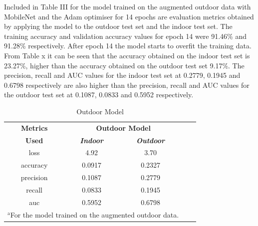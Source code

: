 \documentclass[conference]{IEEEtran}
\begin{document}
Included in Table III for the model trained on the augmented outdoor data with MobileNet and the Adam optimiser for 14 epochs are evaluation metrics obtained by applying the model to the outdoor test set and the indoor test set. The training accuracy and validation accuracy values for epoch 14 were 91.46\% and 91.28\% respectively. After epoch 14 the model starts to overfit the training data. From Table x it can be seen that the accuracy obtained on the indoor test set is 23.27\%, higher than the accuracy obtained on the outdoor test set 9.17\%. The precision, recall and AUC values for the indoor test set at 0.2779, 0.1945 and 0.6798 respectively are also higher than the precision, recall and AUC values for the outdoor test set at  0.1087, 0.0833 and 0.5952 respectively. 


\begin{table}[htbp]
\caption{Outdoor Model}
\begin{center}
\begin{tabular}{|c|c|c|c|c|}
\hline
\textbf{Metrics}&\multicolumn{2}{|c|}{\textbf{Outdoor Model}} \\
\cline{2-3} 
\textbf{Used} & \textbf{\textit{Indoor}}& \textbf{\textit{Outdoor}} \\
\hline
loss  &4.92 &3.70  \\
\hline
accuracy  &0.0917 &0.2327 \\
\hline
precision  &0.1087 &0.2779 \\
\hline
recall  &0.0833 &0.1945 \\
\hline
auc  &0.5952 &0.6798  \\
\hline
\multicolumn{3}{l}{$^{\mathrm{a}}$For the model trained on the augmented outdoor data.}
\end{tabular}
\label{tab1}
\end{center}
\end{table}
\end{document}
